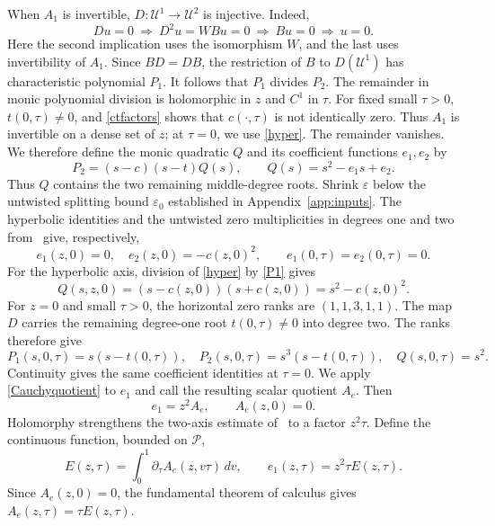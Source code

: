 \documentclass[11pt,letterpaper,reqno]{amsart}
\theoremstyle{remark}
\newcommand{\cU}{\mathcal U}
\begin{document}
When $A_1$ is invertible, $D:\cU^1\to\cU^2$ is injective. Indeed,
\[
 Du=0\ \Longrightarrow\ D^2u=WBu=0
 \ \Longrightarrow\ Bu=0\ \Longrightarrow\ u=0.
\]
Here the second implication uses the isomorphism $W$, and the last
uses invertibility of $A_1$. Since $BD=DB$, the restriction of $B$ to
$D(\cU^1)$ has characteristic polynomial $P_1$. It follows that $P_1$
divides $P_2$.
The remainder in monic polynomial division is holomorphic in $z$
and $C^1$ in $\tau$. For fixed small $\tau>0$, $t(0,\tau)\ne0$,
and \eqref{ctfactors} shows that $c(\cdot,\tau)$ is not identically zero.
Thus $A_1$ is invertible on a dense set of $z$; at $\tau=0$, we use
\eqref{hyper}. The remainder vanishes. We therefore define the monic quadratic
$Q$ and its coefficient functions $e_1,e_2$ by
\begin{equation}\label{P2}
 P_2=(s-c)(s-t)Q(s),\qquad Q(s)=s^2-e_1s+e_2.
\end{equation}
Thus $Q$ contains the two remaining middle-degree roots.
Shrink $\varepsilon$ below the untwisted splitting bound $\varepsilon_0$
established in Appendix~\ref{app:inputs}.
The hyperbolic identities and the untwisted zero multiplicities
in degrees one and two from~\cite[Theorem~3 and Corollary~4.1]{CDDP}
give, respectively,
\begin{equation}\label{qhyper}
 e_1(z,0)=0,\quad e_2(z,0)=-c(z,0)^2,
 \qquad e_1(0,\tau)=e_2(0,\tau)=0.
\end{equation}
For the hyperbolic axis, division of \eqref{hyper} by \eqref{P1} gives
\[
 Q(s,z,0)=(s-c(z,0))(s+c(z,0))=s^2-c(z,0)^2.
\]
For $z=0$ and small $\tau>0$, the horizontal zero ranks are
$(1,1,3,1,1)$. The map $D$ carries the remaining degree-one root
$t(0,\tau)\ne0$ into degree two. The ranks therefore give
\[
 P_1(s,0,\tau)=s(s-t(0,\tau)),\quad
 P_2(s,0,\tau)=s^3(s-t(0,\tau)),\quad Q(s,0,\tau)=s^2.
\]
Continuity gives the same coefficient identities at $\tau=0$.
We apply \eqref{Cauchyquotient} to $e_1$ and call the resulting scalar
quotient $A_e$. Then
\begin{equation}\label{factors}
 e_1=z^2A_e,\qquad A_e(z,0)=0.
\end{equation}
Holomorphy strengthens the two-axis estimate of~\cite{Lawton} to a factor
$z^2\tau$. Define the continuous function, bounded on $\mathcal P$,
\begin{equation}\label{twoaxisfactor}
 E(z,\tau)=\int_0^1\partial_\tau A_e(z,v\tau)\,dv,
 \qquad e_1(z,\tau)=z^2\tau E(z,\tau).
\end{equation}
Since $A_e(z,0)=0$, the fundamental theorem of calculus gives
$A_e(z,\tau)=\tau E(z,\tau)$.
\end{document}
